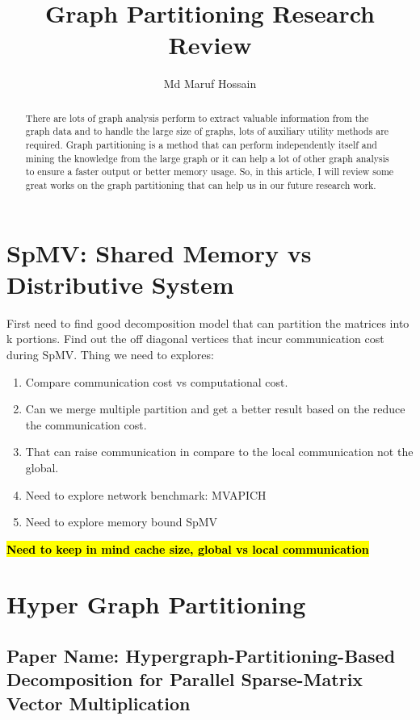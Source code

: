 \documentclass[conference, onecolumn]{IEEEtran}
\newcommand{\todo}[1]{\color{red}\textbf{\hl{#1}}\color{black}\xspace}
\begin{document}
\title{Graph Partitioning Research Review}


\author{Md Maruf Hossain}

\maketitle

\begin{abstract}
There are lots of graph analysis perform to extract valuable information from the graph data and to handle the large 
size of graphs, lots of auxiliary utility methods are required. Graph partitioning is a method that can perform 
independently itself and mining the knowledge from the large graph or it can help a lot of other graph analysis to 
ensure a faster output or better memory usage. So, in this article, I will review some great works on the graph partitioning 
that can help us in our future research work.    
\end{abstract}

\section{SpMV: Shared Memory vs Distributive System}
First need to find good decomposition model that can partition the matrices into k portions. Find out the off diagonal vertices 
that incur communication cost during SpMV. Thing we need to explores: 
\begin{enumerate}
\item Compare communication cost vs computational cost.
\item Can we merge multiple partition and get a better result based on the reduce the communication cost.
\item That can raise communication in compare to the local communication not the global.
\item Need to explore network benchmark: MVAPICH
\item Need to explore memory bound SpMV
\end{enumerate}
\todo{Need to keep in mind cache size, global vs local communication}

\section{Hyper Graph Partitioning}
\subsection{Paper Name: Hypergraph-Partitioning-Based Decomposition for Parallel Sparse-Matrix Vector Multiplication} 
\end{document}
